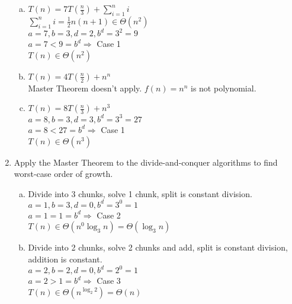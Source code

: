 \documentclass[11pt]{article}
\begin{document}
\begin{enumerate}
\begin{enumerate}[(a)]
			\item
				$ T(n) = 7T(\frac{n}{3}) + \sum_{i=1}^{n} i $ \\
					\hspace*{.4cm}
					$ \sum_{i=1}^{n} i = \frac{1}{2}n(n+1) \in \Theta(n^2) $ \\
					\hspace*{.4cm}
					$ a=7, b=3, d=2, b^d=3^2=9 $ \\
					\hspace*{.4cm}
					$ a=7 < 9=b^d \Rightarrow $ Case  1\\
					\hspace*{.4cm}
					$ T(n) \in \Theta(n^2) $ \\
			\item
				$ T(n) = 4T(\frac{n}{2}) + n^n $ \\
					Master Theorem doesn't apply. $ f(n)=n^n $ is not polynomial. \\
			\item
				$ T(n) = 8T(\frac{n}{3}) + n^3 $ \\
					\hspace*{.4cm}
					$ a=8, b=3, d=3, b^d=3^3=27 $ \\
					\hspace*{.4cm}
					$ a=8 < 27=b^d \Rightarrow $ Case 1 \\
					\hspace*{.4cm}
					$ T(n) \in \Theta(n^3) $ \\
		\end{enumerate}

	\item 
		Apply the Master Theorem to the divide-and-conquer algorithms to find worst-case order of growth.
		\begin{enumerate}[(a)]
			\item 
				Divide into 3 chunks, solve 1 chunk, split is constant division. \\
					\hspace*{.4cm}
					$ a=1, b=3, d=0, b^d=3^0=1 $ \\
					\hspace*{.4cm}
					$ a=1 = 1=b^d \Rightarrow $ Case 2 \\
					\hspace*{.4cm}
					$ T(n) \in \Theta(n^0 \log_3 n) = \Theta(\log_3 n) $ \\
			\item
				Divide into 2 chunks, solve 2 chunks and add, split is constant division, addition is constant. \\
					\hspace*{.4cm}
					$ a=2, b=2, d=0, b^d=2^0=1 $ \\
					\hspace*{.4cm}
					$ a=2 > 1=b^d \Rightarrow $ Case 3 \\
					\hspace*{.4cm}
					$ T(n) \in \Theta(n^{\log_2 2}) = \Theta(n) $ \\				
		\end{enumerate}


\end{enumerate}
\end{document}
